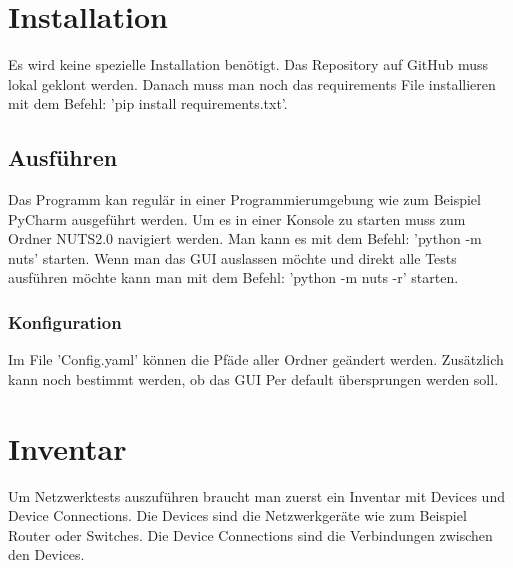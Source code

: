 \documentclass[
	ngerman,
	toc=listof, %
	toc=bibliography, %
	footnotes=multiple, %
	parskip=half, %
	numbers=noendperiod %
]{scrartcl}
\newcommand{\vorlagenOrdner}{../99_Vorlagen} %
\begin{document}
\thispagestyle{plain}

\cleardoublepage


{}
\tableofcontents
\cleardoublepage

\let\stdsection\section
\renewcommand\section{\clearpage\stdsection}

\section{Installation}
	Es wird keine spezielle Installation benötigt. Das Repository auf GitHub muss lokal geklont werden.
	Danach muss man noch das requirements File installieren mit dem Befehl: 'pip install requirements.txt'.
	\subsection{Ausführen}
	Das Programm kan regulär in einer Programmierumgebung wie zum Beispiel PyCharm ausgeführt werden.
	Um es in einer Konsole zu starten muss zum Ordner NUTS2.0 navigiert werden. 
	Man kann es mit dem Befehl: 'python -m nuts' starten. Wenn man das GUI auslassen möchte und direkt alle Tests 
	ausführen möchte kann man mit dem Befehl: 'python -m nuts -r' starten.
	\subsubsection{Konfiguration}
	Im File 'Config.yaml' können die Pfäde aller Ordner geändert werden. 
	Zusätzlich kann noch bestimmt werden, ob das GUI Per default übersprungen werden soll.

\section{Inventar}
	Um Netzwerktests auszuführen braucht man zuerst ein Inventar mit Devices und Device Connections.
	Die Devices sind die Netzwerkgeräte wie zum Beispiel Router oder Switches.
	Die Device Connections sind die Verbindungen zwischen den Devices.
\end{document}
